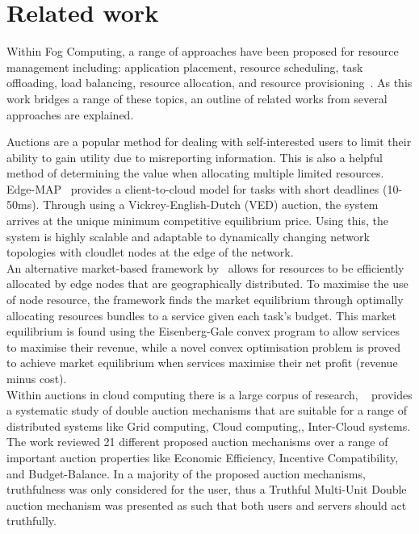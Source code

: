 \section{Related work}
\label{sec:related-work}
Within Fog Computing, a range of approaches have been proposed for resource management including:
application placement, resource scheduling, task offloading, load balancing, resource allocation,
and resource provisioning~\cite{ghobaei2019resource}. As this work bridges a range of these topics, an outline of
related works from several approaches are explained.

Auctions are a popular method for dealing with self-interested users to limit their ability to gain utility due to misreporting
information. This is also a helpful method of determining the value when allocating multiple limited
resources. Edge-MAP~\cite{tasiopoulos2018edge} provides a client-to-cloud model for tasks with short deadlines
(10-50ms). Through using a Vickrey-English-Dutch (VED) auction, the system arrives at the unique minimum competitive
equilibrium price. Using this, the system is highly scalable and adaptable to dynamically changing network topologies
with cloudlet nodes at the edge of the network. \\
An alternative market-based framework by~\cite{8373684} allows for resources to be efficiently allocated by edge nodes that
are geographically distributed. To maximise the use of node resource, the framework finds the market
equilibrium through optimally allocating resources bundles to a service given each task's budget. This market
equilibrium is found using the Eisenberg-Gale convex program to allow services to maximise their revenue, while a novel
convex optimisation problem is proved to achieve market equilibrium when services maximise their net profit
(revenue minus cost). \\
Within auctions in cloud computing there is a large corpus of research, ~\cite{KUMAR2017234} provides a systematic study
of double auction mechanisms that are suitable for a range of distributed systems like Grid computing, Cloud computing,,
Inter-Cloud systems. The work reviewed 21 different proposed auction mechanisms over a range of important auction
properties like Economic Efficiency, Incentive Compatibility, and Budget-Balance. In a majority of the proposed auction
mechanisms, truthfulness was only considered for the user, thus a Truthful Multi-Unit Double auction mechanism was
presented as such that both users and servers should act truthfully.

